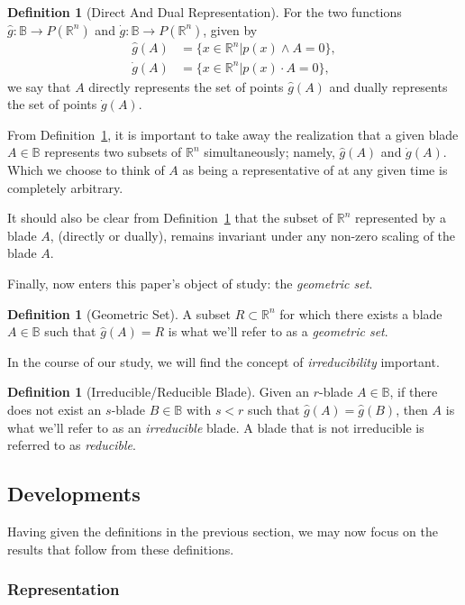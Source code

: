 \documentclass{birkjour}
\theoremstyle{definition}
\newtheorem{defn}[thm]{Definition}
\theoremstyle{remark}
\numberwithin{equation}{section}
\newcommand{\R}{\mathbb{R}}
\newcommand{\B}{\mathbb{B}}
\newcommand{\gd}{\dot{g}}
\newcommand{\gh}{\hat{g}}
\begin{document}
\begin{defn}[Direct And Dual Representation]\label{def_gh_and_gd}
For the two functions $\gh:\B\to P(\R^n)$ and $\gd:\B\to P(\R^n)$, given by
\begin{align}
\gh(A) &= \{x\in\R^n|p(x)\wedge A=0\},\\
\gd(A) &= \{x\in\R^n|p(x)\cdot A=0\},
\end{align}
we say that $A$ directly represents the set of points $\gh(A)$ and
dually represents the set of points $\gd(A)$.
\end{defn}

From Definition~\ref{def_gh_and_gd}, it is important to take away the realization that a given blade $A\in\B$
represents two subsets of $\R^n$ simultaneously; namely, $\gh(A)$ and $\gd(A)$.  Which we choose
to think of $A$ as being a representative of at any given time is completely arbitrary.

It should also be clear from Definition~\ref{def_gh_and_gd} that the subset of $\R^n$ represented by a
blade $A$, (directly or dually), remains invariant under any non-zero scaling of the blade $A$.

Finally, now enters this paper's object of study: the {\it geometric set}.

\begin{defn}[Geometric Set]\label{def_geo_set}
A subset $R\subset\R^n$ for which there exists a blade $A\in\B$ such that $\gh(A)=R$ is what
we'll refer to as a {\it geometric set}.
\end{defn}

In the course of our study, we will find the concept of {\it irreducibility} important.

\begin{defn}[Irreducible/Reducible Blade]\label{def_irreducible_blade}
Given an $r$-blade $A\in\B$, if there does not exist an $s$-blade $B\in\B$ with $s<r$
such that $\gh(A)=\gh(B)$, then $A$ is what we'll refer to as an {\it irreducible} blade.
A blade that is not irreducible is referred to as {\it reducible}.
\end{defn}

\subsection{Developments}

Having given the definitions in the previous section, we may now focus on the results that follow
from these definitions.

\subsubsection{Representation}
\end{document}
